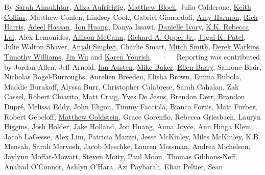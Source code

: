 By \href{https://www.nytimes3xbfgragh.onion/by/sarah-almukhtar}{Sarah
Almukhtar},
\href{https://www.nytimes3xbfgragh.onion/by/aliza-aufrichtig}{Aliza
Aufrichtig},
\href{https://www.nytimes3xbfgragh.onion/by/matthew-bloch}{Matthew
Bloch}, Julia Calderone,
\href{https://www.nytimes3xbfgragh.onion/by/keith-collins}{Keith
Collins}, Matthew Conlen, Lindsey Cook, Gabriel Gianordoli,
\href{https://www.nytimes3xbfgragh.onion/by/amy-harmon}{Amy Harmon},
\href{https://www.nytimes3xbfgragh.onion/by/rich-harris}{Rich Harris},
\href{https://www.nytimes3xbfgragh.onion/by/adeel-hassan}{Adeel Hassan},
\href{https://www.nytimes3xbfgragh.onion/by/jon-huang}{Jon Huang}, Danya
Issawi,
\href{https://www.nytimes3xbfgragh.onion/by/danielle-ivory}{Danielle
Ivory}, \href{https://www.nytimes3xbfgragh.onion/by/kk-rebecca-lai}{K.K.
Rebecca Lai}, Alex Lemonides,
\href{https://www.nytimes3xbfgragh.onion/by/allison-mccann}{Allison
McCann},
\href{https://www.nytimes3xbfgragh.onion/by/richard-a-oppel-jr}{Richard
A. Oppel Jr.},
\href{https://www.nytimes3xbfgragh.onion/by/jugal-k-patel}{Jugal K.
Patel}, Julie Walton Shaver,
\href{https://www.nytimes3xbfgragh.onion/by/anjali-singhvi}{Anjali
Singhvi}, Charlie Smart,
\href{https://www.nytimes3xbfgragh.onion/by/mitch-smith}{Mitch Smith},
\href{https://www.nytimes3xbfgragh.onion/by/derek-watkins}{Derek
Watkins},
\href{https://www.nytimes3xbfgragh.onion/by/timothy-williams}{Timothy
Williams}, \href{https://www.nytimes3xbfgragh.onion/by/jin-wu}{Jin Wu}
and \href{https://www.nytimes3xbfgragh.onion/by/karen-yourish}{Karen
Yourish}. ~~·~~ Reporting was contributed by Jordan Allen, Jeff Arnold,
\href{https://www.nytimes3xbfgragh.onion/by/ian-austen}{Ian Austen},
\href{https://www.nytimes3xbfgragh.onion/by/mike-baker}{Mike Baker},
\href{https://www.nytimes3xbfgragh.onion/by/ellen-barry}{Ellen Barry},
Samone Blair, Nicholas Bogel-Burroughs, Aurelien Breeden, Elisha Brown,
Emma Bubola, Maddie Burakoff, Alyssa Burr, Christopher Calabrese, Sarah
Cahalan, Zak Cassel, Robert Chiarito, Matt Craig, Yves De Jesus, Brendon
Derr, Brandon Dupré, Melissa Eddy, John Eligon, Timmy Facciola, Bianca
Fortis, Matt Furber, Robert Gebeloff,
\href{https://www.nytimes3xbfgragh.onion/by/matthew-goldstein}{Matthew
Goldstein}, Grace Gorenflo, Rebecca Griesbach, Lauryn Higgins, Josh
Holder, Jake Holland, Jon Huang, Anna Joyce, Ann Hinga Klein, Jacob
LaGesse, Alex Lim, Patricia Mazzei, Jesse McKinley, Miles McKinley, K.B.
Mensah, Sarah Mervosh, Jacob Meschke, Lauren Messman, Andrea Michelson,
Jaylynn Moffat-Mowatt, Steven Moity, Paul Moon, Thomas Gibbons-Neff,
Anahad O'Connor, Ashlyn O'Hara, Azi Paybarah, Elian Peltier, Sean
